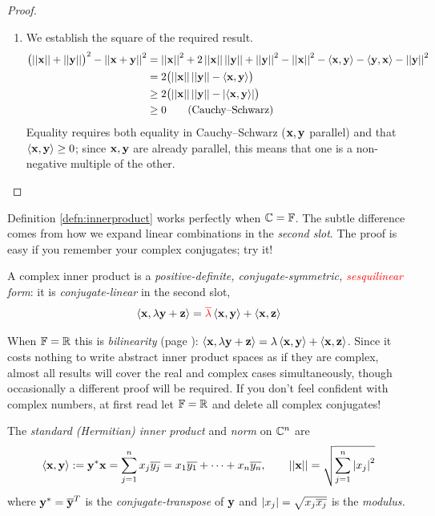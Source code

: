 \begin{proof}
\begin{enumerate}
	  \item We establish the square of the required result.
	  \begin{align*}
		  \bigl(\Nm\vx+\Nm\vy\bigr)^2-\Nm{\vx+\vy}^2&=\Nm\vx^2+2\Nm\vx\Nm\vy+\Nm\vy^2-\Nm\vx^2-\ip{\vx,\vy}-\ip{\vy,\vx}-\Nm\vy^2\\
		  &=2\bigl(\Nm\vx\Nm\vy-\ip{\vx,\vy}\bigr)\\
		  &\ge 2\bigl(\Nm\vx\Nm\vy-\nm{\ip{\vx,\vy}}\bigr)\\
		  &\ge 0 \tag{Cauchy--Schwarz}
	  \end{align*}
	  Equality requires both equality in Cauchy--Schwarz ($\vx,\vy$ parallel) and that $\ip{\vx,\vy}\ge 0$; since $\vx,\vy$ are already parallel, this means that one is a non-negative multiple of the other.\qedhere
	\end{enumerate}
\end{proof}


\pagebreak[3]



Definition \ref{defn:innerproduct} works perfectly when $\C=\F$. The subtle difference comes from how we expand linear combinations in the \emph{second slot}. The proof is easy if you remember your complex conjugates; try it!

\begin{lemm}{}{}
	A complex inner product is a \emph{positive-definite, conjugate-symmetric, \textcolor{red}{sesquilinear}\footnotemark{} form}: it is \emph{conjugate-linear} in the second slot,
	\[
		\ip{\vx,\lambda\vy+\vz}=\textcolor{red}{\cl\lambda}\ip{\vx,\vy}+\ip{\vx,\vz}
	\]
\end{lemm}


When $\F=\R$ this is \emph{bilinearity} (page \pageref{sec:realbilinearity}): $\ip{\vx,\lambda\vy+\vz}=\lambda\ip{\vx,\vy}+\ip{\vx,\vz}$. Since it costs nothing to write abstract inner product spaces as if they are complex, almost all results will cover the real and complex cases simultaneously, though occasionally a different proof will be required. If you don't feel confident with complex numbers, at first read let $\F=\R$ and delete all complex conjugates! %


\begin{defn}{}{}
	The \emph{standard (Hermitian) inner product} and \emph{norm} on $\C^n$ are
	\[
		\ip{\vx,\vy} :=\vy^*\vx 
		=\sum_{j=1}^nx_j\cl{y_j}
		=x_1\cl{y_1}+\cdots+x_n\cl{y_n},\qquad 
		\Nm{\vx}=\sqrt{\sum_{j=1}^n\nm{x_j}^2}
	\]
	where $\vy^*=\cl\vy^T$ is the \emph{conjugate-transpose\footnotemark{}} of $\vy$ and $\nm{x_j}=\sqrt{x_j\cl{x_j}}$ is the \emph{modulus.}
\end{defn}

